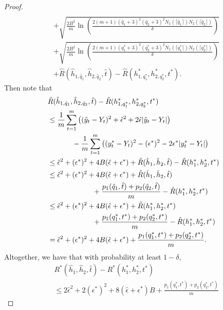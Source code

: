 \documentclass{article}
\newcommand{\pen}[0]{p}
\begin{document}
\begin{proof}
\begin{align*}
\\ & + \sqrt{\frac{2B^{2}}{m}\ln\left(\frac{2 (m+1) (\hat{q}_{1}+3)^{2} (\hat{q}_{2}+3)^{2} N_{1}(\lceil \hat{q}_{1} \rceil) N_{2}(\lceil \hat{q}_{2} \rceil)}{\delta}\right)}
\\ & + \sqrt{\frac{2B^{2}}{m}\ln\left(\frac{2 (m+1) (q_{1}^{*}+3)^{2} (q_{2}^{*}+3)^{2} N_{1}(\lceil q_{1}^{*} \rceil) N_{2}(\lceil q_{2}^{*} \rceil)}{\delta}\right)}
\\ & + \hat{R}(\hat{h}_{1,\hat{q}_{1}},\hat{h}_{2,\hat{q}_{2}},\hat{t}) - \hat{R}(h_{1,q_{1}^{*}}^{*},h_{2,q_{2}^{*}}^{*},t^{*}).
\end{align*}
Then note that
\begin{align*}
& \hat{R}(\hat{h}_{1,\hat{q}_{1}},\hat{h}_{2,\hat{q}_{2}},\hat{t}) - \hat{R}(h_{1,q_{1}^{*}}^{*},h_{2,q_{2}^{*}}^{*},t^{*})
\\ & \leq \frac{1}{m} \sum_{t=1}^{m} \left( (\hat{y}_{t} - Y_{t})^{2} + \hat{\epsilon}^{2} + 2 \hat{\epsilon} |\hat{y}_{t} - Y_{t}| \right)
\\ & {\hskip 12mm}- \frac{1}{m} \sum_{t=1}^{m} \left( (y_{t}^{*} - Y_{t})^{2} - (\epsilon^{*})^{2} - 2 \epsilon^{*} |y_{t}^{*} - Y_{t}| \right)
\\ & \leq \hat{\epsilon}^{2} + (\epsilon^{*})^{2} + 4 B ( \hat{\epsilon} + \epsilon^{*} ) + \hat{R}(\hat{h}_{1},\hat{h}_{2},\hat{t}) - \hat{R}(h_{1}^{*}, h_{2}^{*}, t^{*})
\\ & \leq \hat{\epsilon}^{2} + (\epsilon^{*})^{2} + 4 B ( \hat{\epsilon} + \epsilon^{*} ) + \hat{R}(\hat{h}_{1},\hat{h}_{2},\hat{t}) 
\\ & {\hskip 22mm}+ \frac{\pen_{1}(\hat{q}_{1},\hat{t}) + \pen_{2}(\hat{q}_{2},\hat{t})}{m} - \hat{R}(h_{1}^{*}, h_{2}^{*}, t^{*})
\\ & \leq \hat{\epsilon}^{2} + (\epsilon^{*})^{2} + 4 B ( \hat{\epsilon} + \epsilon^{*} ) + \hat{R}(h_{1}^{*},h_{2}^{*},t^{*}) 
\\ & {\hskip 22mm}+ \frac{\pen_{1}(q_{1}^{*},t^{*}) + \pen_{2}(q_{2}^{*},t^{*})}{m} - \hat{R}(h_{1}^{*}, h_{2}^{*}, t^{*})
\\ & = \hat{\epsilon}^{2} + (\epsilon^{*})^{2} + 4 B ( \hat{\epsilon} + \epsilon^{*} ) + \frac{\pen_{1}(q_{1}^{*},t^{*}) + \pen_{2}(q_{2}^{*},t^{*})}{m}.
\end{align*}
Altogether, we have that with probability at least $1-\delta$, 
\begin{align*}
& R^{*}(\hat{h}_{1},\hat{h}_{2},\hat{t}) - R^{*}(h_{1}^{*},h_{2}^{*},t^{*})
\\ & \leq 2\hat{\epsilon}^{2} + 2(\epsilon^{*})^{2} + 8 ( \hat{\epsilon} + \epsilon^{*} ) B + \frac{\pen_{1}(q_{1}^{*},t^{*}) + \pen_{2}(q_{2}^{*},t^{*})}{m}

\end{align*}
\end{proof}
\end{document}
